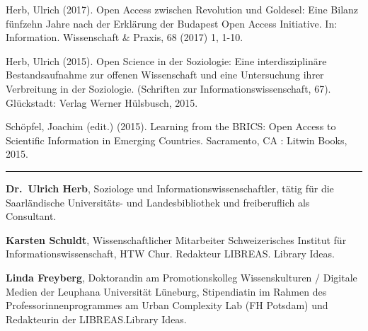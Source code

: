 \documentclass[a4paper,
fontsize=11pt,
oneside,
numbers=noperiodatend,
parskip=half-,
bibliography=totoc,
final
]{scrartcl}
\begin{document}
Herb, Ulrich (2017). Open Access zwischen Revolution und Goldesel: Eine
Bilanz fünfzehn Jahre nach der Erklärung der Budapest Open Access
Initiative. In: Information. Wissenschaft \& Praxis, 68 (2017) 1, 1-10.

Herb, Ulrich (2015). Open Science in der Soziologie: Eine
interdisziplinäre Bestandsaufnahme zur offenen Wissenschaft und eine
Untersuchung ihrer Verbreitung in der Soziologie. (Schriften zur
Informationswissenschaft, 67). Glückstadt: Verlag Werner Hülsbusch,
2015.

Schöpfel, Joachim (edit.) (2015). Learning from the BRICS: Open Access
to Scientific Information in Emerging Countries. Sacramento, CA : Litwin
Books, 2015.

\begin{center}\rule{0.5\linewidth}{\linethickness}\end{center}

\textbf{Dr.~Ulrich Herb}, Soziologe und Informationswissenschaftler,
tätig für die Saarländische Universitäts- und Landesbibliothek und
freiberuflich als Consultant.

\textbf{Karsten Schuldt}, Wissenschaftlicher Mitarbeiter Schweizerisches
Institut für Informationswissenschaft, HTW Chur. Redakteur LIBREAS.
Library Ideas.

\textbf{Linda Freyberg}, Doktorandin am Promotionskolleg Wissenskulturen
/ Digitale Medien der Leuphana Universität Lüneburg, Stipendiatin im
Rahmen des Professorinnenprogrammes am Urban Complexity Lab (FH Potsdam)
und Redakteurin der LIBREAS.Library Ideas.
\end{document}
